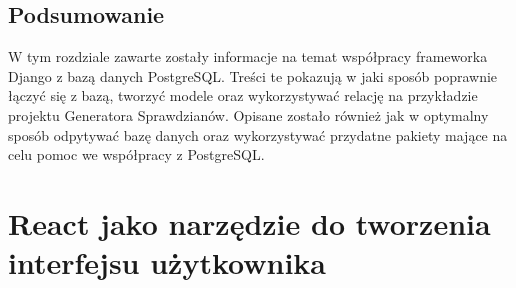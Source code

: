 \documentclass[oneside,polski,logo,indent]{amuthesis}
\begin{document}
\section{Podsumowanie}
W tym rozdziale zawarte zostały informacje na temat współpracy frameworka Django z bazą danych PostgreSQL. Treści te pokazują w jaki sposób poprawnie łączyć się z bazą, tworzyć modele oraz wykorzystywać relację na przykładzie projektu Generatora Sprawdzianów. Opisane zostało również jak w optymalny sposób odpytywać bazę danych oraz wykorzystywać przydatne pakiety mające na celu pomoc we współpracy z PostgreSQL.

\chapter {React jako narzędzie do tworzenia interfejsu użytkownika}
\end{document}
